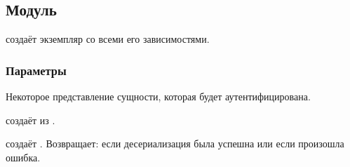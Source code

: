 \subsection{Модуль }\label{page-FPauth-core-module-FPauth+u+core-module-Session+u+manager-module-Make}%
 создаёт экземпляр \hyperref[page-FPauth-core-module-FPauth+u+core-module-Auth+u+sign-module-type-SESSIONMANAGER]{} со всеми его зависимостями.

\subsubsection{Параметры\label{parameters}}%
\label{page-FPauth-core-module-FPauth+u+core-module-Session+u+manager-module-Make-argument-1-M}\begin{ocamlindent}\label{page-FPauth-core-module-FPauth+u+core-module-Session+u+manager-module-Make-argument-1-M-type-t}\begin{ocamlindent}Некоторое представление сущности, которая будет аутентифицирована.\end{ocamlindent}%
\medbreak
\label{page-FPauth-core-module-FPauth+u+core-module-Session+u+manager-module-Make-argument-1-M-val-serialize}\begin{ocamlindent} создаёт  из \hyperref[page-FPauth-core-module-FPauth+u+core-module-Session+u+manager-module-Make-argument-1-M-type-t]{}.\end{ocamlindent}%
\medbreak
\label{page-FPauth-core-module-FPauth+u+core-module-Session+u+manager-module-Make-argument-1-M-val-deserialize}\begin{ocamlindent} создаёт \hyperref[page-FPauth-core-module-FPauth+u+core-module-Session+u+manager-module-Make-argument-1-M-type-t]{}. Возвращает:  если десериализация была успешна или  если произошла ошибка.\end{ocamlindent}%

\end{ocamlindent}
